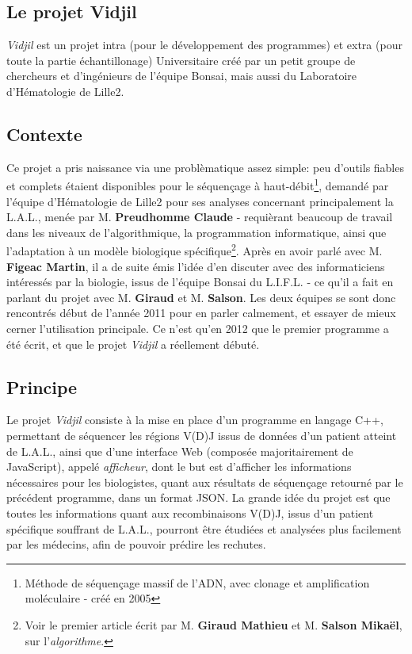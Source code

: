 \documentclass[12pt]{report}
\begin{document}
\begin{spacing}{1.2}
\section{Le projet Vidjil}

\textit{Vidjil} est un projet intra (pour le développement des programmes) et extra (pour toute la partie échantillonage) Universitaire créé par un petit groupe de chercheurs et d'ingénieurs de l'équipe Bonsai, mais aussi du Laboratoire d'Hématologie de Lille2.
\subsection{Contexte}
Ce projet a pris naissance via une problèmatique assez simple: peu d'outils fiables et complets étaient disponibles pour le séquençage à haut-débit\footnote{Méthode de séquençage massif de l'ADN, avec clonage et amplification moléculaire - créé en 2005}, demandé par l'équipe d'Hématologie de Lille2 pour ses analyses concernant principalement la L.A.L., menée par M. \textbf{Preudhomme Claude} - requièrant beaucoup de travail dans les niveaux de l'algorithmique, la programmation informatique, ainsi que l'adaptation à un modèle biologique spécifique\footnote{Voir le premier article écrit par M. \textbf{Giraud Mathieu} et M. \textbf{Salson Mikaël}, sur l'\textit{algorithme}.}.
\newline
Après en avoir parlé avec M. \textbf{Figeac Martin}, il a de suite émis l'idée d'en discuter avec des informaticiens intéressés par la biologie, issus de l'équipe Bonsai du L.I.F.L. - ce qu'il a fait en parlant du projet avec M. \textbf{Giraud} et M. \textbf{Salson}.
\newline
Les deux équipes se sont donc rencontrés début de l'année 2011 pour en parler calmement, et essayer de mieux cerner l'utilisation principale. Ce n'est qu'en 2012 que le premier programme a été écrit, et que le projet \textit{Vidjil} a réellement débuté.

\subsection{Principe}
Le projet \textit{Vidjil} consiste à la mise en place d'un programme en langage C++, permettant de séquencer les régions V(D)J issus de données d'un patient atteint de L.A.L., ainsi que d'une interface Web (composée majoritairement de JavaScript), appelé \textit{afficheur}, dont le but est d'afficher les informations nécessaires pour les biologistes, quant aux résultats de séquençage retourné par le précédent programme, dans un format JSON.
\newline
La grande idée du projet est que toutes les informations quant aux recombinaisons V(D)J, issus d'un patient spécifique souffrant de L.A.L., pourront être étudiées et analysées plus facilement par les médecins, afin de pouvoir prédire les rechutes.


\end{spacing}
\end{document}
